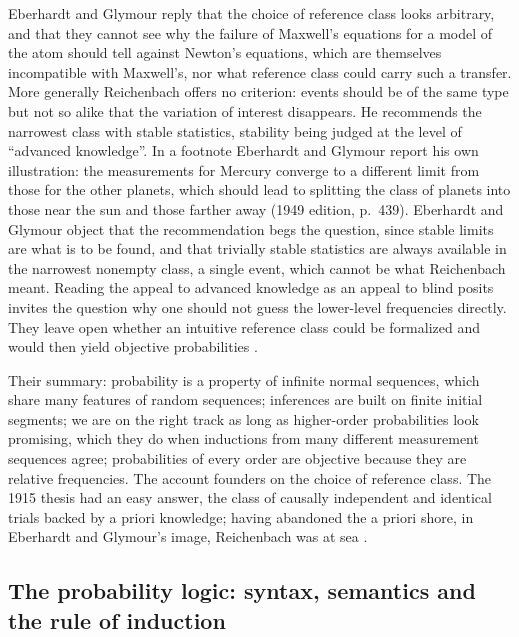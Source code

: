 Eberhardt and Glymour reply that the choice of reference class looks arbitrary,
and that they cannot see why the failure of Maxwell's equations for a
model of the atom should tell against Newton's equations, which are
themselves incompatible with Maxwell's, nor what reference class could
carry such a transfer. More generally Reichenbach offers no criterion:
events should be of the same type but not so alike that the variation
of interest disappears. He recommends the narrowest class with stable
statistics, stability being judged at the level of ``advanced
knowledge''. In a footnote Eberhardt and Glymour report his own illustration: the
measurements for Mercury converge to a different limit from those for
the other planets, which should lead to splitting the class of planets
into those near the sun and those farther away (1949 edition, p.~439).
Eberhardt and Glymour object that the recommendation begs the question, since
stable limits are what is to be found, and that trivially stable
statistics are always available in the narrowest nonempty class, a
single event, which cannot be what Reichenbach meant. Reading the appeal
to advanced knowledge as an appeal to blind posits invites the question
why one should not guess the lower-level frequencies directly. They
leave open whether an intuitive reference class could be formalized and
would then yield objective probabilities
\cite[p.~368 and n.~5]{EberhardtGlymour2011ReichenbachReading}.

Their summary: probability is a property of infinite normal sequences,
which share many features of random sequences; inferences are built on
finite initial segments; we are on the right track as long as
higher-order probabilities look promising, which they do when inductions
from many different measurement sequences agree; probabilities of every
order are objective because they are relative frequencies. The account
founders on the choice of reference class. The 1915 thesis had an easy
answer, the class of causally independent and identical trials backed by
a priori knowledge; having abandoned the a priori shore, in Eberhardt and Glymour's
image, Reichenbach was at sea
\cite[pp.~368--369]{EberhardtGlymour2011ReichenbachReading}.

\subsection{The probability logic: syntax, semantics and the rule of induction}
\label{sec:p15-w02b-p15-030-eg-logic}

